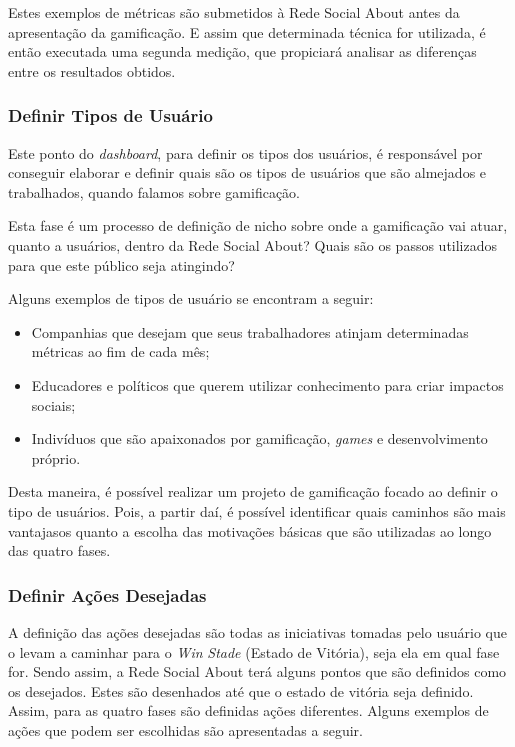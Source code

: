 Estes exemplos de métricas são submetidos à Rede Social About antes da apresentação da
gamificação. E assim que determinada técnica for utilizada, é então executada
 uma
segunda medição, que propiciará analisar as diferenças entre os resultados obtidos.

\subsubsection{Definir Tipos de Usuário}
\label{sub:define_user_types}
Este ponto do \textit{dashboard}, para definir os tipos dos usuários, é responsável por conseguir
elaborar e definir quais são os tipos de usuários que são almejados e trabalhados, quando
falamos sobre gamificação.

Esta fase é um processo de definição de nicho sobre onde a gamificação vai atuar, quanto a
usuários, dentro da Rede Social About? Quais são os passos utilizados para que este público
seja atingindo?

Alguns exemplos de tipos de usuário se encontram a seguir:

\begin{itemize}
    \item Companhias que desejam que seus trabalhadores atinjam determinadas métricas
        ao fim de cada mês;
    \item Educadores e políticos que querem utilizar conhecimento para criar impactos
        sociais;
    \item Indivíduos que são apaixonados por gamificação, \textit{games} e desenvolvimento próprio.
\end{itemize}

Desta maneira, é possível realizar um projeto de gamificação focado ao definir o tipo
de usuários. Pois, a partir daí, é possível identificar quais caminhos são mais vantajasos
quanto a escolha das motivações básicas que são utilizadas ao longo das quatro fases.

\subsubsection{Definir Ações Desejadas}
\label{sub:define_desired_actions}
A definição das ações desejadas são todas as iniciativas tomadas pelo usuário que o levam a caminhar para
o \textit{Win} \textit{Stade} (Estado de Vitória), seja ela em qual fase for. Sendo assim, a Rede Social
About terá alguns pontos que são definidos como os desejados. Estes são desenhados
até que o estado de vitória seja definido. Assim, para as quatro fases são definidas
ações diferentes. Alguns exemplos de ações que podem ser escolhidas são apresentadas
a seguir.

